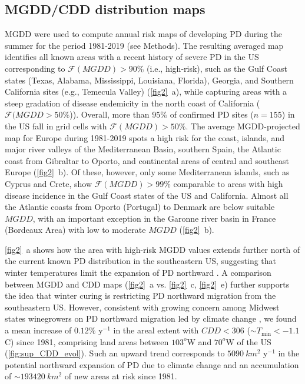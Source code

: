 \subsection{MGDD/CDD distribution maps}

MGDD were used to compute annual risk maps of developing PD during the summer
for the period 1981-2019 (see Methods). The resulting averaged map identifies
all known areas with a recent history of severe PD in the US corresponding to
$\mathcal{F}(MGDD) > 90\%$ (i.e., high-risk), such as the Gulf Coast states
(Texas, Alabama, Mississippi, Louisiana, Florida), Georgia, and Southern
California sites (e.g., Temecula Valley)
(\cref{fig2}~\textcolor{ref_color}{a}), while capturing areas
with a steep gradation of disease endemicity in the north coast of California
($\mathcal{F}(MGDD>50\%$)).	Overall, more than $95\%$ of confirmed PD sites
    ($n = 155$) in the US fall in grid cells with $\mathcal{F}(MGDD) > 50 \%$.
    The average MGDD-projected map for Europe during 1981-2019 spots a high
    risk for the coast, islands, and major river valleys of the Mediterranean
    Basin, southern Spain, the Atlantic coast from Gibraltar to Oporto, and
    continental areas of central and southeast Europe
    (\cref{fig2}~\textcolor{ref_color}{b}). Of these,
    however, only some Mediterranean islands, such as Cyprus and Crete, show
$\mathcal{F}(MGDD) > 99\%$ comparable to areas with high disease incidence in
    the Gulf Coast states of the US and California. Almost all the Atlantic
    coasts from Oporto (Portugal) to Denmark are below suitable $MGDD$, with an
    important exception in the Garonne river basin in France (Bordeaux Area)
    with low to moderate $MGDD$ (\cref{fig2}~\textcolor{ref_color}{b}).

    \cref{fig2}~\textcolor{ref_color}{a} shows how the area with high-risk MGDD
    values extends further north of the current known PD distribution in the
    southeastern US, suggesting that winter temperatures limit the expansion of
    PD northward
    \cite{Hopkins2002}. A comparison between MGDD and CDD maps
    (\cref{fig2}~\textcolor{ref_color}{a}
    vs.
    \cref{fig2}~\textcolor{ref_color}{c}, \cref{fig2}~\textcolor{ref_color}{e})
    further supports the idea that winter curing is
    restricting PD northward migration from the southeastern US. However,
    consistent with growing concern among Midwest states winegrowers on PD
    northward migration led by climate change \cite{Galvez2010}, we found a
    mean
    increase of $0.12 \%$ y$^{-1}$ in the areal extent with $CDD < 306$ ($\sim
T_{\textrm{min}} < -1.1$ \textdegree C) since 1981, comprising land areas
    between $103^o$W and $70^o$W of the US (\cref{fig:sup_CDD_evol}). Such an
    upward
    trend corresponds to $\SI{5090}{km^2}$ y$^{-1}$ in the potential northward
    expansion of PD due to climate change and an accumulation of $\sim
\SI{193420}{km^2}$ of new areas at risk since 1981.

